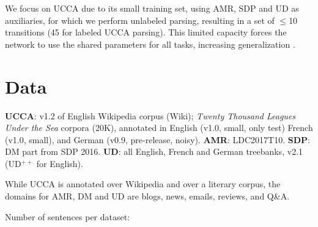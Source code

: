 \documentclass[a0,portrait]{a0poster}
\begin{document}
\begin{multicols}{2}
We focus on UCCA due to its small training set, using AMR, SDP and UD as auxiliaries,
for which we perform unlabeled parsing,
resulting in a set of $\leq$10 transitions (45 for labeled UCCA parsing).
This limited capacity forces the network to use the shared parameters for all tasks,
increasing generalization \cite{E17-1005}.

\section*{Data}

\textbf{\color{violet} UCCA}: v1.2 of English Wikipedia corpus (Wiki);
\textit{Twenty Thousand Leagues Under the Sea} corpora (20K),
annotated in English (v1.0, small, only test) French (v1.0, small), and German (v0.9, pre-release, noisy).
\textbf{\color{teal} AMR}: LDC2017T10.
\textbf{\color{blue} SDP}: DM part from SDP 2016.
\textbf{\color{purple} UD}: all English, French and German treebanks, v2.1 (UD$^{++}$ for English).

While UCCA is annotated over Wikipedia and over a literary corpus,
the domains for AMR, DM and UD are blogs, news, emails, reviews, and Q\&A.

Number of sentences per dataset:


\end{multicols}
\end{document}
